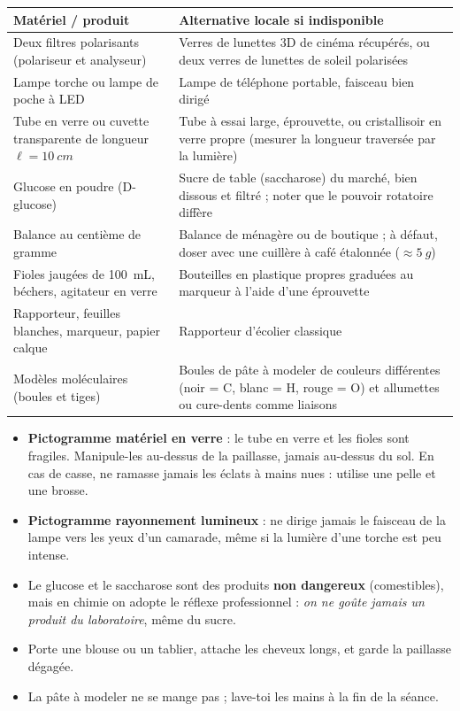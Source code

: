 \documentclass[11pt]{article}
\newcounter{popsec}
\newcounter{popsub}
\newcommand{\courssub}[1]{%
  \stepcounter{popsub}%
  \par\vspace{9pt}\noindent{\popxbold\fontsize{11.5}{13}\selectfont\color{popink}{\color{poporange}\thepopsec.\thepopsub}\hspace{6pt}#1}\par\nopagebreak\vspace{4pt}
}
\begin{document}
\begin{center}
\begin{tabularx}{\linewidth}{|l|X|}
\hline
\rowcolor{popblue!40} \textbf{Matériel / produit} & \textbf{Alternative locale si indisponible} \\
\hline
Deux filtres polarisants (polariseur et analyseur) & Verres de lunettes 3D de cinéma récupérés, ou deux verres de lunettes de soleil polarisées \\
\hline
Lampe torche ou lampe de poche à LED & Lampe de téléphone portable, faisceau bien dirigé \\
\hline
Tube en verre ou cuvette transparente de longueur $\ell = \SI{10}{cm}$ & Tube à essai large, éprouvette, ou cristallisoir en verre propre (mesurer la longueur traversée par la lumière) \\
\hline
Glucose en poudre (D-glucose) & Sucre de table (saccharose) du marché, bien dissous et filtré ; noter que le pouvoir rotatoire diffère \\
\hline
Balance au centième de gramme & Balance de ménagère ou de boutique ; à défaut, doser avec une cuillère à café étalonnée ($\approx \SI{5}{g}$) \\
\hline
Fioles jaugées de \SI{100}{mL}, béchers, agitateur en verre & Bouteilles en plastique propres graduées au marqueur à l'aide d'une éprouvette \\
\hline
Rapporteur, feuilles blanches, marqueur, papier calque & Rapporteur d'écolier classique \\
\hline
Modèles moléculaires (boules et tiges) & Boules de pâte à modeler de couleurs différentes (noir = C, blanc = H, rouge = O) et allumettes ou cure-dents comme liaisons \\
\hline
\end{tabularx}
\end{center}

\courssub{Sécurité}

\begin{attention}
\begin{itemize}
\item \textbf{Pictogramme \og matériel en verre \fg{}} : le tube en verre et les fioles sont fragiles. Manipule-les au-dessus de la paillasse, jamais au-dessus du sol. En cas de casse, ne ramasse jamais les éclats à mains nues : utilise une pelle et une brosse.
\item \textbf{Pictogramme \og rayonnement lumineux \fg{}} : ne dirige jamais le faisceau de la lampe vers les yeux d'un camarade, même si la lumière d'une torche est peu intense.
\item Le glucose et le saccharose sont des produits \textbf{non dangereux} (comestibles), mais en chimie on adopte le réflexe professionnel : \emph{on ne goûte jamais un produit du laboratoire}, même du sucre.
\item Porte une blouse ou un tablier, attache les cheveux longs, et garde la paillasse dégagée.
\item La pâte à modeler ne se mange pas ; lave-toi les mains à la fin de la séance.
\end{itemize}
\end{attention}
\end{document}

